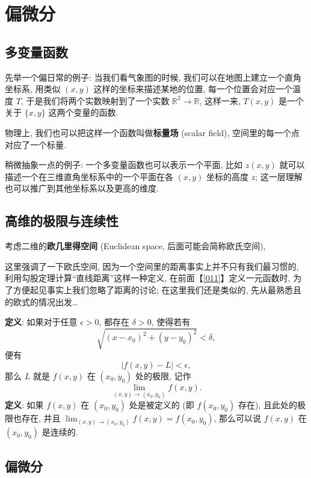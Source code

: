 \section{偏微分}\label{023}

\subsection{多变量函数}

先举一个偏日常的例子: 当我们看气象图的时候,
我们可以在地图上建立一个直角坐标系, 用类似 \((x,y)\)
这样的坐标来描述某地的位置, 每一个位置会对应一个温度 \(T\),
于是我们将两个实数映射到了一个实数
\(\mathbb{R}^2\rightarrow\mathbb{R}\), 这样一来, \(T(x,y)\) 是一个关于
\(\{x,y\}\) 这两个变量的函数.

\begin{newquote}
物理上, 我们也可以把这样一个函数叫做\textbf{标量场} (scalar field),
空间里的每一个点对应了一个标量.
\end{newquote}

稍微抽象一点的例子: 一个多变量函数也可以表示一个平面, 比如 \(z(x,y)\)
就可以描述一个在三维直角坐标系中的一个平面在各 \((x,y)\) 坐标的高度
\(z\); 这一层理解也可以推广到其他坐标系以及更高的维度.

\subsection{高维的极限与连续性}

考虑二维的\textbf{欧几里得空间} (Euclidean space,
后面可能会简称欧氏空间),

\begin{newquote}
这里强调了一下欧氏空间, 因为一个空间里的距离事实上并不只有我们最习惯的,
利用勾股定理计算``直线距离''这样一种定义, 在前面【\ref{011}】定义一元函数时,
为了方便起见事实上我们忽略了距离的讨论; 在这里我们还是类似的,
先从最熟悉且的欧式的情况出发\ldots{}
\end{newquote}

\textbf{定义}: 如果对于任意 \(\epsilon>0\), 都存在 \(\delta>0\),
使得若有 \[
\sqrt{(x-x_0)^2+(y-y_0)^2}<\delta,
\] 便有 \[
|f(x,y)-L|<\epsilon,
\] 那么 \(L\) 就是 \(f(x,y)\) 在 \((x_0,y_0)\) 处的极限, 记作 \[
\lim_{(x,y)\rightarrow(x_0,y_0)}f(x,y).
\] \textbf{定义}: 如果 \(f(x,y)\) 在 \((x_0,y_0)\) 处是被定义的 (即
\(f(x_0,y_0)\) 存在), 且此处的极限也存在, 并且
\(\lim_{(x,y)\rightarrow(x_0,y_0)}f(x,y)=f(x_0,y_0)\), 那么可以说
\(f(x,y)\) 在 \((x_0,y_0)\) 是连续的.

\subsection{偏微分}


